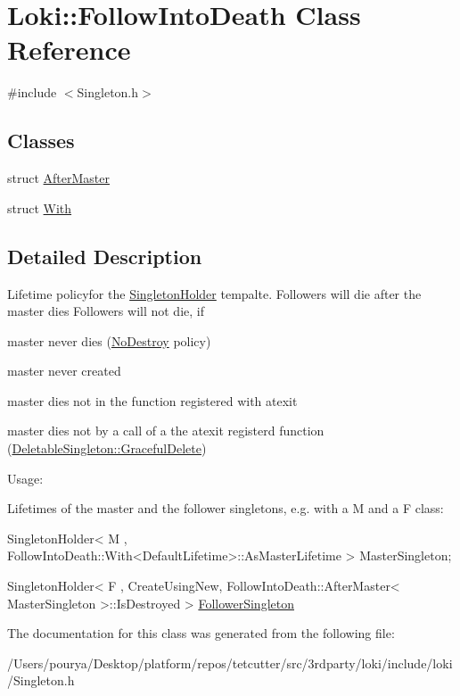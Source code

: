 \hypertarget{classLoki_1_1FollowIntoDeath}{}\section{Loki\+:\+:Follow\+Into\+Death Class Reference}
\label{classLoki_1_1FollowIntoDeath}


{\ttfamily \#include $<$Singleton.\+h$>$}

\subsection*{Classes}
\begin{DoxyCompactItemize}
\item 
struct \hyperlink{structLoki_1_1FollowIntoDeath_1_1AfterMaster}{After\+Master}
\item 
struct \hyperlink{structLoki_1_1FollowIntoDeath_1_1With}{With}
\end{DoxyCompactItemize}


\subsection{Detailed Description}
Lifetime policyfor the \hyperlink{classLoki_1_1SingletonHolder}{Singleton\+Holder} tempalte. Followers will die after the master dies Followers will not die, if
\begin{DoxyItemize}
\item master never dies (\hyperlink{structLoki_1_1NoDestroy}{No\+Destroy} policy)
\item master never created
\item master dies not in the function registered with atexit
\item master dies not by a call of a the atexit registerd function (\hyperlink{classLoki_1_1DeletableSingleton_a626c2dc57146f1aea6bf911682f8e3e9}{Deletable\+Singleton\+::\+Graceful\+Delete})
\end{DoxyItemize}

\begin{DoxyParagraph}{Usage\+:}

\end{DoxyParagraph}
Lifetimes of the master and the follower singletons, e.\+g. with a M and a F class\+: 
\begin{DoxyCode}
SingletonHolder< M , FollowIntoDeath::With<DefaultLifetime>::AsMasterLifetime > MasterSingleton; 
\end{DoxyCode}
 
\begin{DoxyCode}
SingletonHolder< F , CreateUsingNew, FollowIntoDeath::AfterMaster< MasterSingleton >::IsDestroyed > 
      \hyperlink{classFollowerSingleton}{FollowerSingleton} 
\end{DoxyCode}
 

The documentation for this class was generated from the following file\+:\begin{DoxyCompactItemize}
\item 
/\+Users/pourya/\+Desktop/platform/repos/tetcutter/src/3rdparty/loki/include/loki/Singleton.\+h\end{DoxyCompactItemize}

